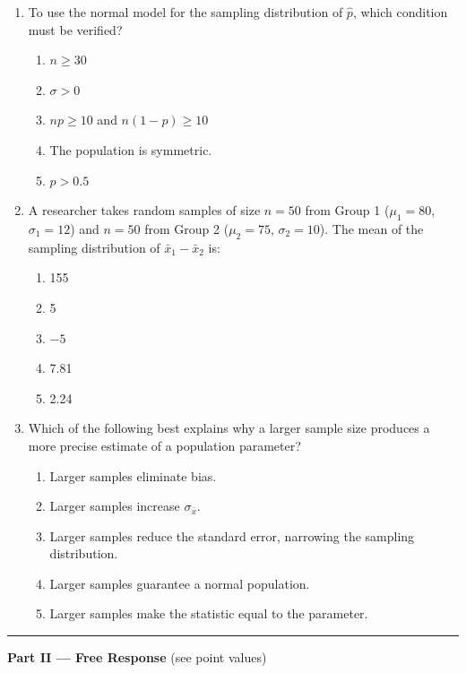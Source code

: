 \documentclass[10pt]{article}
\begin{document}
\begin{enumerate}
  \item To use the normal model for the sampling distribution of $\hat{p}$, which condition
        must be verified?
    \begin{enumerate}[label=(\Alph*)]
      \item $n \ge 30$
      \item $\sigma > 0$
      \item $np \ge 10$ and $n(1-p) \ge 10$
      \item The population is symmetric.
      \item $p > 0.5$
    \end{enumerate}

  \item A researcher takes random samples of size $n = 50$ from Group 1 ($\mu_1 = 80$,
        $\sigma_1 = 12$) and $n = 50$ from Group 2 ($\mu_2 = 75$, $\sigma_2 = 10$). The
        mean of the sampling distribution of $\bar{x}_1 - \bar{x}_2$ is:
    \begin{enumerate}[label=(\Alph*)]
      \item 155 \item 5 \item $-5$ \item 7.81 \item 2.24
    \end{enumerate}

  \item Which of the following best explains why a larger sample size produces a more
        precise estimate of a population parameter?
    \begin{enumerate}[label=(\Alph*)]
      \item Larger samples eliminate bias.
      \item Larger samples increase $\sigma_{\bar{x}}$.
      \item Larger samples reduce the standard error, narrowing the sampling distribution.
      \item Larger samples guarantee a normal population.
      \item Larger samples make the statistic equal to the parameter.
    \end{enumerate}

\end{enumerate}

\vspace{0.15in}
\noindent\rule{\linewidth}{0.4pt}
\vspace{0.1in}

\noindent\textbf{Part II --- Free Response} \hfill (see point values)
\end{document}
